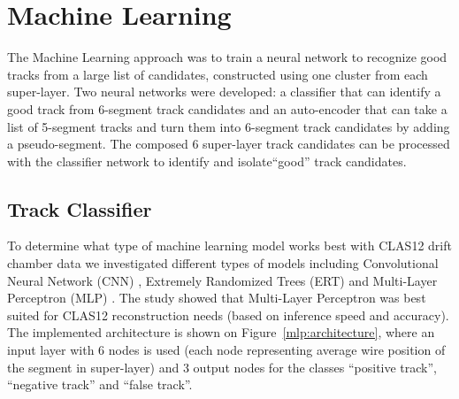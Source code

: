 \section{Machine Learning}

The Machine Learning approach was to train a neural network to recognize good tracks
 from a large list of candidates, constructed using one cluster from each super-layer.
 Two neural networks were developed: a classifier that can identify a good track from  6-segment
 track candidates  and an auto-encoder that can take a list of 5-segment tracks and turn them into 6-segment 
 track candidates by adding a pseudo-segment. The composed 6 super-layer track candidates 
 can be processed with the classifier network to identify and isolate``good'' track candidates.

 
 \subsection{Track Classifier}
 
 To determine what type of machine learning model works best with CLAS12 drift chamber data we investigated different 
 types of models  \cite{Gavalian:2020oxg} including Convolutional Neural Network (CNN) , Extremely Randomized Trees (ERT) \cite{scikitlearn-extratreesclassifier} and 
 Multi-Layer Perceptron (MLP) \cite{scikitlearn-mlpclassifier}. The study showed that Multi-Layer Perceptron was best suited for 
 CLAS12 reconstruction needs (based on inference speed and accuracy). The implemented architecture is shown on 
 Figure~\ref{mlp:architecture}, where an input layer with 6 nodes is used (each node representing average wire position 
 of the segment in super-layer) and 3 output nodes for the classes ``positive track'', ``negative track'' and ``false track''.
 
